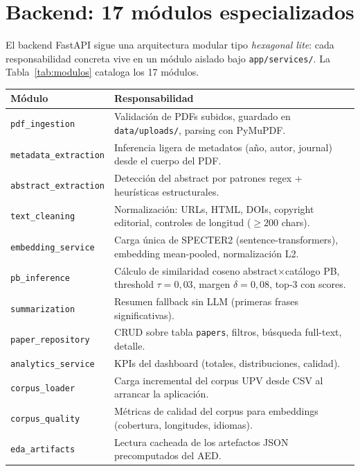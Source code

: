 \documentclass[11pt,a4paper]{article}
\newcommand{\modulo}[1]{\texttt{\textcolor{accent}{#1}}}
\newcommand{\file}[1]{\texttt{\small #1}}
\begin{document}
\section{Backend: 17 módulos especializados}

El backend FastAPI sigue una arquitectura modular tipo \emph{hexagonal lite}: cada responsabilidad concreta vive en un módulo aislado bajo \file{app/services/}. La Tabla~\ref{tab:modulos} cataloga los 17 módulos.

\begin{table}[h]
\centering\small
\begin{tabularx}{\linewidth}{l X}
\toprule
\textbf{Módulo} & \textbf{Responsabilidad} \\
\midrule
\modulo{pdf\_ingestion} & Validación de PDFs subidos, guardado en \file{data/uploads/}, parsing con PyMuPDF. \\
\modulo{metadata\_extraction} & Inferencia ligera de metadatos (año, autor, journal) desde el cuerpo del PDF. \\
\modulo{abstract\_extraction} & Detección del abstract por patrones regex + heurísticas estructurales. \\
\modulo{text\_cleaning} & Normalización: URLs, HTML, DOIs, copyright editorial, controles de longitud (\(\geq 200\) chars). \\
\modulo{embedding\_service} & Carga única de SPECTER2 (sentence-transformers), embedding mean-pooled, normalización L2. \\
\modulo{pb\_inference} & Cálculo de similaridad coseno abstract$\times$catálogo PB, threshold \(\tau{=}0{,}03\), margen \(\delta{=}0{,}08\), top-3 con scores. \\
\modulo{summarization} & Resumen fallback sin LLM (primeras frases significativas). \\
\modulo{paper\_repository} & CRUD sobre tabla \texttt{papers}, filtros, búsqueda full-text, detalle. \\
\modulo{analytics\_service} & KPIs del dashboard (totales, distribuciones, calidad). \\
\modulo{corpus\_loader} & Carga incremental del corpus UPV desde CSV al arrancar la aplicación. \\
\modulo{corpus\_quality} & Métricas de calidad del corpus para embeddings (cobertura, longitudes, idiomas). \\
\modulo{eda\_artifacts} & Lectura cacheada de los artefactos JSON precomputados del AED. \\

\end{tabularx}
\end{table}
\end{document}
